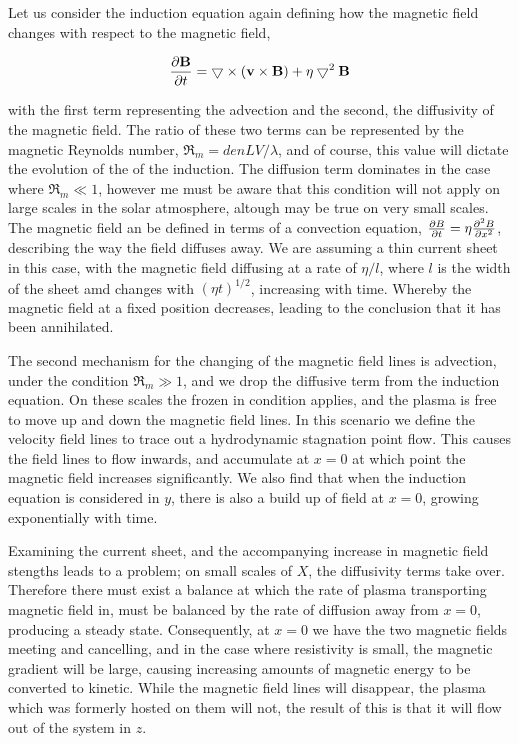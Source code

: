 Let us consider the induction equation again defining how the magnetic field changes with respect to the magnetic field,

\begin{equation}
	\frac{\partial \mathbf{B}}{\partial t } = \bigtriangledown \times (\mathbf{v} \times \mathbf{B}) + \eta\bigtriangledown^2\mathbf{B}
\end{equation} 

with the first term representing the advection and the second, the diffusivity of the magnetic field.
The ratio of these two terms can be represented by the magnetic Reynolds number, $\Re_m = {den}LV/\lambda$, and of course, this value will dictate the evolution of the of the induction.
The diffusion term dominates in the case where $\Re_m \ll 1$, however me must be aware that this condition will not apply on large scales in the solar atmosphere, altough may be true on very small scales.
The magnetic field an be defined in terms of a convection equation, $\frac{\partial B}{\partial t } = \eta\frac{\partial^2B}{\partial x^2}$, describing the way the field diffuses away.
We are assuming a thin current sheet in this case, with the magnetic field diffusing at a rate of $\eta/l$, where $l$ is the width of the sheet amd changes with $(\eta t)^{1/2}$, increasing with time.
Whereby the magnetic field at a fixed position decreases, leading to the conclusion that it has been annihilated.

The second mechanism for the changing of the magnetic field lines is advection, under the condition $\Re_m \gg 1$, and we drop the diffusive term from the induction equation.
On these scales the frozen in condition applies, and the plasma is free to move up and down the magnetic field lines.
In this scenario we define the velocity field lines to trace out a hydrodynamic stagnation point flow.
This causes the field lines to flow inwards, and accumulate at $x = 0$ at which point the magnetic field increases significantly.
We also find that when the induction equation is considered in $y$, there is also a build up of field at $x = 0$, growing exponentially with time.

Examining the current sheet, and the accompanying increase in magnetic field stengths leads to a problem; on small scales of $X$, the diffusivity terms take over.
Therefore there must exist a balance at which the rate of plasma transporting magnetic field in, must be balanced by the rate of diffusion away from $x = 0$, producing a steady state.
Consequently, at $x = 0$ we have the two magnetic fields meeting and cancelling, and in the case where resistivity is small, the magnetic gradient will be large, causing increasing amounts of magnetic energy to be converted to kinetic.
While the magnetic field lines will disappear, the plasma which was formerly hosted on them will not, the result of this is that it will flow out of the system in $z$.

